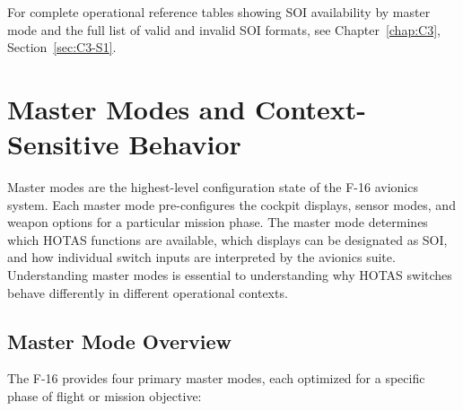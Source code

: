 \documentclass[11pt, a4paper, twoside]{report}
\begin{document}
For complete operational reference tables showing SOI availability by master mode and the full list of valid and invalid SOI formats, see Chapter~\ref{chap:C3}, Section~\ref{sec:C3-S1}.


\section{Master Modes and Context-Sensitive Behavior}
\label{sec:C2-S2}

Master modes are the highest-level configuration state of the F-16 avionics system. Each master mode pre-configures the cockpit displays, sensor modes, and weapon options for a particular mission phase. The master mode determines which HOTAS functions are available, which displays can be designated as SOI, and how individual switch inputs are interpreted by the avionics suite. Understanding master modes is essential to understanding why HOTAS switches behave differently in different operational contexts.


\subsection{Master Mode Overview}
\label{sec:C2-S2-S1}

The F-16 provides four primary master modes, each optimized for a specific phase of flight or mission objective:
\end{document}
